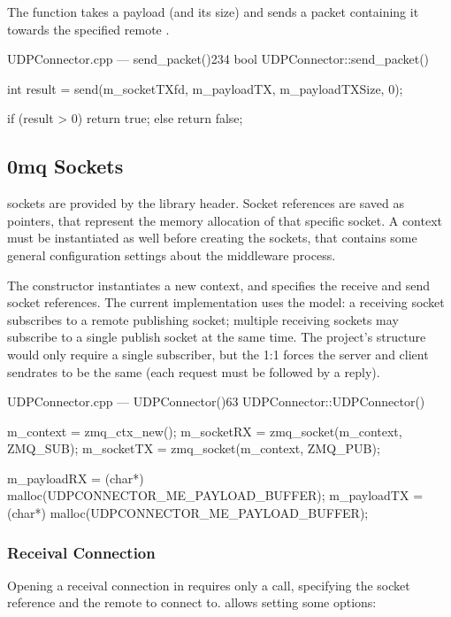 The  function takes a \gls{payload} (and its size) and sends a \gls{packet} containing it towards the specified remote .

\begin{codelist}{UDPConnector.cpp --- send\_packet()}{234}
bool UDPConnector::send_packet() {
	int result = send(m_socketTXfd, m_payloadTX, m_payloadTXSize, 0);

	if (result > 0)
		return true;
	else
		return false;
}
\end{codelist}

\subsection{0mq Sockets}

 sockets are provided by the  library  header. Socket references are saved as  pointers, that represent the memory allocation of that specific socket. A context must be instantiated as well before creating the sockets, that contains some general configuration settings about the  middleware process.

The  constructor instantiates a new context, and specifies the receive and send socket references. The current implementation uses the  model: a receiving socket subscribes to a remote publishing socket; multiple receiving sockets may subscribe to a single publish socket at the same time. The project's structure would only require a single subscriber, but the 1:1   forces the server and client sendrates to be the same (each request must be followed by a reply).

\begin{codelist}{UDPConnector.cpp --- UDPConnector()}{63}
UDPConnector::UDPConnector() {
	m_context  = zmq_ctx_new();
	m_socketRX = zmq_socket(m_context, ZMQ_SUB);
	m_socketTX = zmq_socket(m_context, ZMQ_PUB);

	m_payloadRX = (char*) malloc(UDPCONNECTOR_ME_PAYLOAD_BUFFER);
	m_payloadTX = (char*) malloc(UDPCONNECTOR_ME_PAYLOAD_BUFFER);
}
\end{codelist}

\subsubsection{Receival Connection}

Opening a receival connection in  requires only a  call, specifying the socket reference and the remote  to connect to.  allows setting some options:

